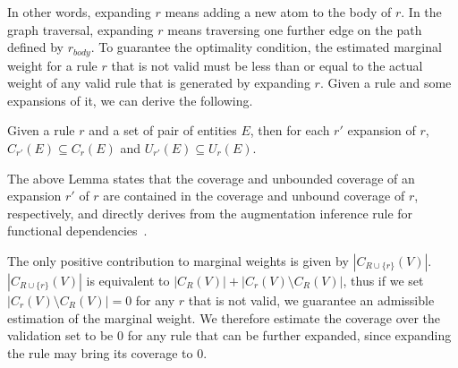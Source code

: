 In other words, expanding $r$ means adding a new atom to the body of $r$. In the graph traversal, expanding $r$ means traversing one further edge on the path defined by $r_{body}$. To guarantee the optimality condition, the estimated marginal weight for a rule $r$ that is not valid must be less than or equal to the actual weight of any valid rule that is generated by expanding $r$. Given a rule and some expansions of it, we can derive the following.

\begin{lemma} \label{lemma:krd_exp_cov}
	Given a rule $r$ and a set of pair of entities $E$, then for each $r'$ expansion of $r$, $C_{r'}(E) \subseteq C_r(E)$ and $U_{r'}(E) \subseteq U_r(E)$.
\end{lemma}
\vspace{0.5ex}

The above Lemma states that the coverage and unbounded coverage of an expansion $r'$ of $r$ are contained in the coverage and unbound coverage of $r$, respectively, and directly derives from the augmentation inference rule for functional dependencies~\cite{abiteboul1995foundations}. 

The only positive contribution to marginal weights is given by $|C_{R \cup \{r\}}(V)|$. $|C_{R \cup \{r\}}(V)|$ is equivalent to $|C_{R}(V)| + |C_r(V) \setminus C_R(V)|$, thus if we set $|C_r(V) \setminus C_R(V)|=0$ for any $r$ that is not valid, we guarantee an admissible estimation of the marginal weight. We therefore estimate the coverage over the validation set to be $0$ for any rule that can be further expanded, since expanding the rule may bring its coverage to $0$.


